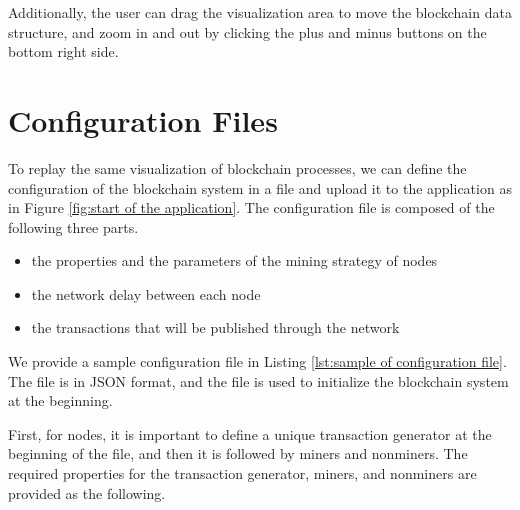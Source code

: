 Additionally, the user can drag the visualization area to move the blockchain data structure, and zoom in and out by clicking the plus and minus buttons on the bottom right side.

\section{Configuration Files}

To replay the same visualization of blockchain processes, we can define the configuration of the blockchain system in a file and upload it to the application as in Figure \ref{fig:start of the application}. The configuration file is composed of the following three parts.

\begin{itemize}
    \item the properties and the parameters of the mining strategy of nodes
    \item the network delay between each node
    \item the transactions that will be published through the network
\end{itemize}

We provide a sample configuration file in Listing \ref{lst:sample of configuration file}. The file is in JSON format, and the file is used to initialize the blockchain system at the beginning.

First, for nodes, it is important to define a unique transaction generator at the beginning of the file, and then it is followed by miners and nonminers. The required properties for the transaction generator, miners, and nonminers are provided as the following.

